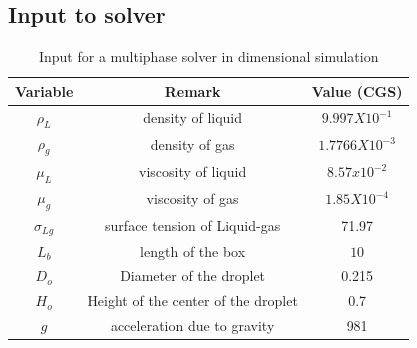 \subsection{Input to solver}
\begin{table}[H]
\centering
\begin{tabular}{||c c c||}
\hline
 Variable & Remark & Value (CGS)  \\ 
 \hline\hline
 $\rho_L$ & density of liquid & $9.997 X 10^{-1}$ \\ 
 \hline
 $\rho_g$ & density of gas & $1.7766X10^{-3}$\\
 \hline
 $\mu_L$ & viscosity of liquid & $8.57x10^{-2}$ \\
 \hline
 $\mu_g$ & viscosity of gas & $1.85X10^{-4}$ \\
 \hline
 $\sigma_{Lg}$ & surface tension of Liquid-gas & 71.97  \\
 \hline
 $L_b$ & length of the box & $10$ \\
 \hline
 $D_o$ & Diameter of the droplet & 0.215 \\
 \hline
 $H_o$ & Height of the center of the droplet & 0.7 \\
 \hline
 $g$ & acceleration due to gravity & 981 \\
\hline
\end{tabular}
\caption{Input for a multiphase solver in dimensional simulation}
 \end{table}
